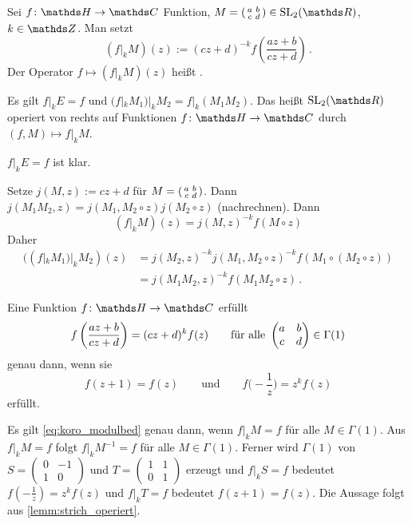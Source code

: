 \begin{defi}
Sei $f\colon \HH \ra \CC$ Funktion, $M = \abcd \in \SL_2(\RR)$, $k\in\ZZ$.
Man setzt
\[
    (f|_k M)(z) := (cz+d)^{-k} f\left(\frac{az+b}{cz+d}\right)
    \,.
\]
Der Operator $f \mapsto (f|_k M)(z)$ heißt .
\end{defi}

\begin{lemm}\label{lemm:strich_operiert}
Es gilt $f|_kE = f$ und $(f|_kM_1)|_kM_2 = f|_k(M_1M_2)$.
Das heißt $\SL_2(\RR)$ operiert von rechts auf Funktionen $f\colon \HH \ra \CC$ durch $(f, M) \mapsto f|_k M$.
\end{lemm}

\begin{bewe}
$f|_kE = f$ ist klar.

Setze $j(M, z) := cz+d$ für $M = \abcd$.
Dann $j(M_1M_2, z) = j(M_1, M_2 \circ z) j(M_2 \circ z)$ (nachrechnen).
Dann
\[
    (f|_kM)(z) = j(M,z)^{-k}f(M \circ z)
\]
Daher
\begin{align*}
    ((f|_kM_1)|_kM_2)(z)
    &= j(M_2, z)^{-k}j(M_1, M_2\circ z)^{-k} f(M_1 \circ (M_2 \circ z)) \\
    &= j(M_1M_2, z)^{-k}f(M_1M_2 \circ z)
    \,.
\end{align*}
\end{bewe}

\begin{koro}
Eine Funktion $f\colon \HH \ra \CC$ erfüllt
\begin{equation}\label{eq:koro_modulbed}
    f\left(\frac{az+b}{cz+d}\right)
    = (cz+d)^kf(z)
    \qquad \text{für alle } \abcd \in \Gamma(1)
\end{equation}
genau dann, wenn sie
\[
    f(z+1) = f(z)
    \qquad \text{und} \qquad
    f\Big(-\frac{1}{z}\Big) = z^k f(z)
\]
erfüllt.
\end{koro}

\begin{bewe}
Es gilt \eqref{eq:koro_modulbed} genau dann, wenn $f|_k M = f$ für alle $M\in\Gamma(1)$.
Aus $f|_kM = f$ folgt $f|_kM^{-1} = f$ für alle $M\in\Gamma(1)$.
Ferner wird $\Gamma(1)$ von $S = (\begin{smallmatrix}0 & -1\\ 1 & 0\end{smallmatrix})$ und $T = (\begin{smallmatrix}1 & 1\\ 0 & 1\end{smallmatrix})$ erzeugt und $f|_kS = f$ bedeutet $f(-\frac{1}{z}) = z^k f(z)$ und $f|_kT = f$ bedeutet $f(z+1) = f(z)$.
Die Aussage folgt aus \autoref{lemm:strich_operiert}.
\end{bewe}

